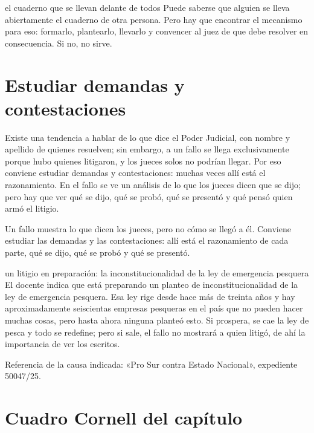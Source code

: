\documentclass[12pt,oneside]{book}
\begin{document}
\begin{example}{el cuaderno que se llevan delante de todos}
Puede saberse que alguien se lleva abiertamente el cuaderno de otra persona. Pero hay que encontrar el mecanismo para eso: formarlo, plantearlo, llevarlo y convencer al juez de que debe resolver en consecuencia. Si no, no sirve.
\end{example}

\section{Estudiar demandas y contestaciones}

Existe una tendencia a hablar de lo que dice el Poder Judicial, con nombre y apellido de quienes resuelven; sin embargo, a un fallo se llega exclusivamente porque hubo quienes litigaron, y los jueces solos no podrían llegar. Por eso conviene estudiar demandas y contestaciones: muchas veces allí está el razonamiento. En el fallo se ve un análisis de lo que los jueces dicen que se dijo; pero hay que ver qué se dijo, qué se probó, qué se presentó y qué pensó quien armó el litigio.

\begin{important}
Un fallo muestra lo que dicen los jueces, pero no cómo se llegó a él. Conviene estudiar las demandas y las contestaciones: allí está el razonamiento de cada parte, qué se dijo, qué se probó y qué se presentó.
\end{important}

\begin{example}{un litigio en preparación: la inconstitucionalidad de la ley de emergencia pesquera}
El docente indica que está preparando un planteo de inconstitucionalidad de la ley de emergencia pesquera. Esa ley rige desde hace más de treinta años y hay aproximadamente seiscientas empresas pesqueras en el país que no pueden hacer muchas cosas, pero hasta ahora ninguna planteó esto. Si prospera, se cae la ley de pesca y todo se redefine; pero si sale, el fallo no mostrará a quien litigó, de ahí la importancia de ver los escritos.

Referencia de la causa indicada: «Pro Sur contra Estado Nacional», expediente 50047/25.
\end{example}

\section{Cuadro Cornell del capítulo}
\end{document}
